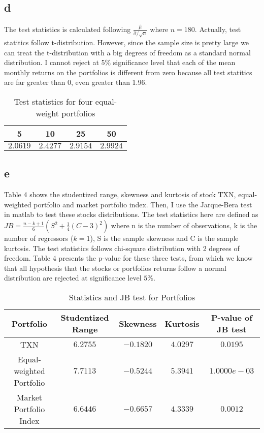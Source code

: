 \documentclass{report}
\begin{document}
\subsection{d}
The test statistics is calculated following $\frac{ \hat{\mu}}{ \hat{\sigma}/ \sqrt{n}} $ where $n = 180$. Actually, test statitics follow t-distribution. However, since the sample size is pretty large we can treat the t-distribution with a big degrees of freedom as a standard normal distribution. I cannot reject at 5\% significance level that each of the mean monthly returns on the portfolios is different from zero because all test statitics are far greater than 0, even greater than 1.96.
\begin{table}[H]
\centering
\begin{tabular}{|c|c|c|c|}
\hline
5&10&25&50\\
\hline
$2.0619$& $2.4277$ & $2.9154$& $2.9924$ \\
\hline
\end{tabular}
\caption{ Test statistics for four equal-weight portfolios }
\end{table}

\subsection{e}
Table 4 shows the studentized range, skewness and kurtosis of stock TXN, equal-weighted portfolio and market portfolio index. Then, I use the Jarque-Bera test in matlab to test these stocks distributions. The test statistics here are defined as $ JB = \frac{ n-k+1}{ 6} ( S^{2} + \frac{1}{4} (C-3)^{2}) $ where n is the number of observations, k is the number of regressors ($ k = 1$), S is the sample skewness and C is the sample kurtosis. The test statistics follows chi-square distribution with 2 degrees of freedom. Table 4 presents the p-value for these three tests, from which we know that all hypothesis that the stocks or portfolios returns follow a normal distribution are rejected at significance level $ 5\%$.
\begin{table}[H]
\centering
\begin{tabular}{|c|c|c|c|c|}
\hline
Portfolio&Studentized Range&Skewness &Kurtosis & P-value of JB test\\
\hline
TXN & $6.2755$ & $-0.1820$ & $4.0297$& $0.0195$ \\
\hline
Equal-weighted Portfolio &$7.7113$& $-0.5244$ & $5.3941$& $1.0000e-03$ \\
\hline
Market Portfolio Index &$6.6446$& $-0.6657$ & $4.3339$& $0.0012$ \\
\hline
\end{tabular}
\caption{ Statistics and JB test for Portfolios }
\end{table}
\end{document}
